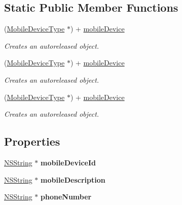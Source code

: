 \subsection*{Static Public Member Functions}
\begin{DoxyCompactItemize}
\item 
(\hyperlink{interface_mobile_device_type}{MobileDeviceType} $\ast$) + \hyperlink{interface_mobile_device_type_a0c3560c92c4e838906154c3c0684a81f}{mobileDevice}
\begin{DoxyCompactList}\small\item\em Creates an autoreleased object. \item\end{DoxyCompactList}\item 
(\hyperlink{interface_mobile_device_type}{MobileDeviceType} $\ast$) + \hyperlink{interface_mobile_device_type_a0c3560c92c4e838906154c3c0684a81f}{mobileDevice}
\begin{DoxyCompactList}\small\item\em Creates an autoreleased object. \item\end{DoxyCompactList}\item 
(\hyperlink{interface_mobile_device_type}{MobileDeviceType} $\ast$) + \hyperlink{interface_mobile_device_type_a0c3560c92c4e838906154c3c0684a81f}{mobileDevice}
\begin{DoxyCompactList}\small\item\em Creates an autoreleased object. \item\end{DoxyCompactList}\end{DoxyCompactItemize}
\subsection*{Properties}
\begin{DoxyCompactItemize}
\item 
\hypertarget{interface_mobile_device_type_a87e4a6fa64dfc1b4f71414cb2a372486}{
\hyperlink{class_n_s_string}{NSString} $\ast$ {\bfseries mobileDeviceId}}
\label{interface_mobile_device_type_a87e4a6fa64dfc1b4f71414cb2a372486}

\item 
\hypertarget{interface_mobile_device_type_a7fb612ed28dca3f41001d71640e8dd01}{
\hyperlink{class_n_s_string}{NSString} $\ast$ {\bfseries mobileDescription}}
\label{interface_mobile_device_type_a7fb612ed28dca3f41001d71640e8dd01}

\item 
\hypertarget{interface_mobile_device_type_a23c110f319ec62866ef2cd307d2efe62}{
\hyperlink{class_n_s_string}{NSString} $\ast$ {\bfseries phoneNumber}}
\label{interface_mobile_device_type_a23c110f319ec62866ef2cd307d2efe62}

\end{DoxyCompactItemize}


